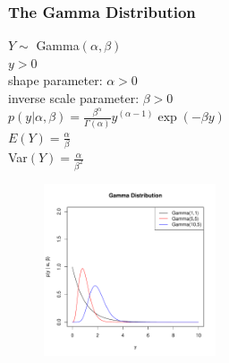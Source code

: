 \documentclass{beamer}
\begin{document}
\begin{frame}
\frametitle{The Gamma Distribution}
\pause
\begin{multicols}{2}
$Y \sim$ Gamma$(\alpha, \beta)$\\
\bigskip
\pause
$y > 0$\\
\bigskip
\pause
shape parameter: $\alpha > 0$\\
\pause
inverse scale parameter: $\beta > 0$ \\
\bigskip
\pause
$p(y| \alpha, \beta) = \frac{\beta^{\alpha}}{\Gamma (\alpha)}
y^{(\alpha - 1)} \exp{(-\beta y)}$\\
\bigskip
\bigskip
\pause
$E(Y) = \frac{\alpha}{\beta}$\\
\bigskip
\pause
Var$(Y) = \frac{\alpha}{\beta^2}$


\begin{figure}[!htp]
\begin{center}
\includegraphics[width=2in, height=2in]{probability-gamma.pdf}
\end{center}
\end{figure}
\end{multicols}
\end{frame}
\end{document}
